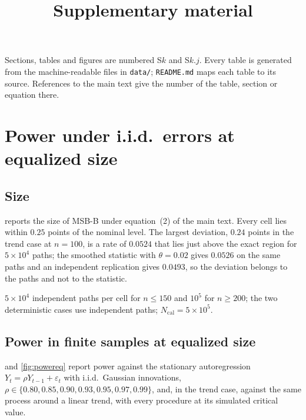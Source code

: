 \documentclass[11pt]{article}
\title{Supplementary material}
\date{}
\newcommand{\rw}{Y}
\newcommand{\ncal}{N_{\mathrm{cal}}}
\newcommand{\RMGLS}{MSB-B}
\begin{document}
\maketitle
Sections, tables and figures are numbered S$k$ and S$k.j$. Every table is generated from the machine-readable files in \texttt{data/}; \texttt{README.md} maps each table to its source. References to the main text give the number of the table, section or equation there.

\FloatBarrier
\section{Power under i.i.d.\ errors at equalized size}\label{supp:s1}

\subsection*{Size}

 reports the size of \RMGLS{} under equation~(2) of the main text. Every
cell lies within $0.25$ points of the nominal level. The largest deviation,
$0.24$ points in the trend case at $n = 100$, is a rate of $0.0524$ that
lies just above the exact region for $5\times 10^4$ paths; the smoothed
statistic with $\theta = 0.02$ gives $0.0526$ on the same paths and an
independent replication gives $0.0493$, so the deviation belongs to the
paths and not to the statistic.

\begin{table}[t]
\centering
\caption{Size of \RMGLS{} under the Gaussian random walk, $\alpha = 0.05$,
with 95\% Wilson intervals.}
\label{tab:size}
\begin{threeparttable}

\begin{tablenotes}\footnotesize
\item $5\times10^4$ independent paths per cell for $n \leq 150$ and
$10^5$ for $n \geq 200$; the two deterministic cases use independent
paths; $\ncal = 5\times 10^5$.
\end{tablenotes}
\end{threeparttable}
\end{table}

\subsection*{Power in finite samples at equalized size}

 and \cref{fig:powereq} report power against
the stationary autoregression $\rw_t = \rho\rw_{t-1} + \varepsilon_t$ with
i.i.d.\ Gaussian innovations, $\rho \in \{0.80, 0.85, 0.90, 0.93, 0.95,
0.97, 0.99\}$, and, in the trend case, against the same process around a
linear trend, with every procedure at its simulated critical value.
\end{document}

